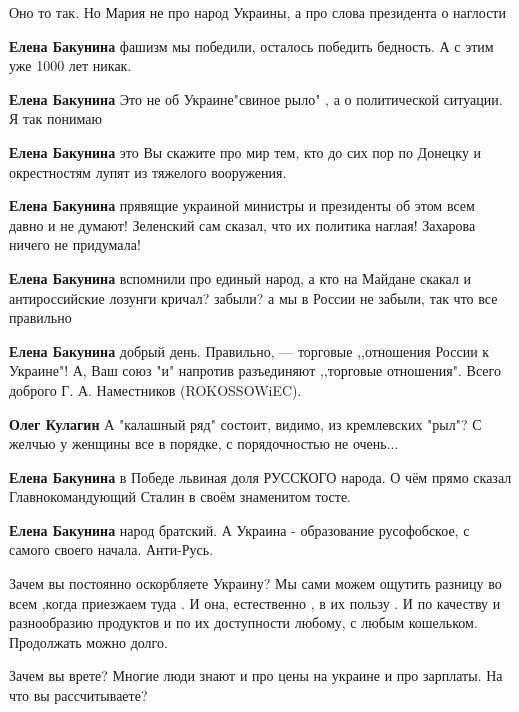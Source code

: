 \begin{itemize}
\begin{itemize}
Оно то так. Но Мария не про народ Украины, а про слова президента о наглости

\textbf{Елена Бакунина} фашизм мы победили, осталось победить бедность. А с этим уже 1000 лет никак.

\textbf{Елена Бакунина} Это не об Украине"свиное рыло" , а о политической ситуации. Я так понимаю

\textbf{Елена Бакунина} это Вы скажите про мир тем, кто до сих пор по Донецку и окрестностям лупят из тяжелого вооружения.

\textbf{Елена Бакунина} прявящие украиной министры и президенты об этом всем давно и не думают! Зеленский сам сказал, что их политика наглая! Захарова ничего не придумала!

\textbf{Елена Бакунина} вспомнили про единый народ, а кто на Майдане скакал и антироссийские лозунги кричал? забыли? а мы в России не забыли, так что все правильно

\textbf{Елена Бакунина} добрый день.
Правильно, — торговые ,,отношения России к Украине"! А, Ваш союз "и" напротив разъединяют ,,торговые отношения".
Всего доброго Г. А. Наместников (ROKOSSOWiEC).

\textbf{Олег Кулагин} А "калашный ряд" состоит, видимо, из кремлевских "рыл"? С желчью у женщины все в порядке, с порядочностью не очень...

\textbf{Елена Бакунина} в Победе львиная доля РУССКОГО народа. О чём прямо сказал Главнокомандующий Сталин в своём знаменитом тосте.

\textbf{Елена Бакунина} народ братский. А Украина - образование русофобское, с самого своего начала. Анти-Русь.

\end{itemize} %


Зачем вы постоянно оскорбляете Украину? Мы сами можем ощутить разницу во всем
,когда приезжаем туда . И она, естественно , в их пользу . И по качеству и
разнообразию продуктов и по их доступности любому, с любым кошельком.
Продолжать можно долго.

\begin{itemize} %
Зачем вы врете? Многие люди знают и про цены на украине и про зарплаты. На что вы рассчитываете?


\end{itemize}
\end{itemize}
